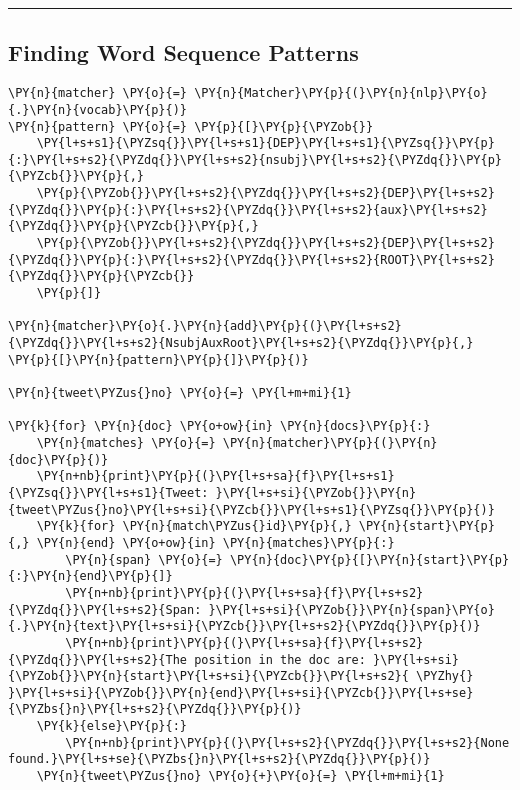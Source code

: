     \begin{center}\rule{0.5\linewidth}{0.5pt}\end{center}

    \hypertarget{finding-word-sequence-patterns}{%
\subsection{Finding Word Sequence
Patterns}\label{finding-word-sequence-patterns}}

    \begin{tcolorbox}[breakable, size=fbox, boxrule=1pt, pad at break*=1mm,colback=cellbackground, colframe=cellborder]
\begin{Verbatim}[commandchars=\\\{\}]
\PY{n}{matcher} \PY{o}{=} \PY{n}{Matcher}\PY{p}{(}\PY{n}{nlp}\PY{o}{.}\PY{n}{vocab}\PY{p}{)}
\PY{n}{pattern} \PY{o}{=} \PY{p}{[}\PY{p}{\PYZob{}}
    \PY{l+s+s1}{\PYZsq{}}\PY{l+s+s1}{DEP}\PY{l+s+s1}{\PYZsq{}}\PY{p}{:}\PY{l+s+s2}{\PYZdq{}}\PY{l+s+s2}{nsubj}\PY{l+s+s2}{\PYZdq{}}\PY{p}{\PYZcb{}}\PY{p}{,} 
    \PY{p}{\PYZob{}}\PY{l+s+s2}{\PYZdq{}}\PY{l+s+s2}{DEP}\PY{l+s+s2}{\PYZdq{}}\PY{p}{:}\PY{l+s+s2}{\PYZdq{}}\PY{l+s+s2}{aux}\PY{l+s+s2}{\PYZdq{}}\PY{p}{\PYZcb{}}\PY{p}{,} 
    \PY{p}{\PYZob{}}\PY{l+s+s2}{\PYZdq{}}\PY{l+s+s2}{DEP}\PY{l+s+s2}{\PYZdq{}}\PY{p}{:}\PY{l+s+s2}{\PYZdq{}}\PY{l+s+s2}{ROOT}\PY{l+s+s2}{\PYZdq{}}\PY{p}{\PYZcb{}}
    \PY{p}{]}

\PY{n}{matcher}\PY{o}{.}\PY{n}{add}\PY{p}{(}\PY{l+s+s2}{\PYZdq{}}\PY{l+s+s2}{NsubjAuxRoot}\PY{l+s+s2}{\PYZdq{}}\PY{p}{,} \PY{p}{[}\PY{n}{pattern}\PY{p}{]}\PY{p}{)}

\PY{n}{tweet\PYZus{}no} \PY{o}{=} \PY{l+m+mi}{1}

\PY{k}{for} \PY{n}{doc} \PY{o+ow}{in} \PY{n}{docs}\PY{p}{:}
    \PY{n}{matches} \PY{o}{=} \PY{n}{matcher}\PY{p}{(}\PY{n}{doc}\PY{p}{)}
    \PY{n+nb}{print}\PY{p}{(}\PY{l+s+sa}{f}\PY{l+s+s1}{\PYZsq{}}\PY{l+s+s1}{Tweet: }\PY{l+s+si}{\PYZob{}}\PY{n}{tweet\PYZus{}no}\PY{l+s+si}{\PYZcb{}}\PY{l+s+s1}{\PYZsq{}}\PY{p}{)}
    \PY{k}{for} \PY{n}{match\PYZus{}id}\PY{p}{,} \PY{n}{start}\PY{p}{,} \PY{n}{end} \PY{o+ow}{in} \PY{n}{matches}\PY{p}{:}
        \PY{n}{span} \PY{o}{=} \PY{n}{doc}\PY{p}{[}\PY{n}{start}\PY{p}{:}\PY{n}{end}\PY{p}{]}
        \PY{n+nb}{print}\PY{p}{(}\PY{l+s+sa}{f}\PY{l+s+s2}{\PYZdq{}}\PY{l+s+s2}{Span: }\PY{l+s+si}{\PYZob{}}\PY{n}{span}\PY{o}{.}\PY{n}{text}\PY{l+s+si}{\PYZcb{}}\PY{l+s+s2}{\PYZdq{}}\PY{p}{)}
        \PY{n+nb}{print}\PY{p}{(}\PY{l+s+sa}{f}\PY{l+s+s2}{\PYZdq{}}\PY{l+s+s2}{The position in the doc are: }\PY{l+s+si}{\PYZob{}}\PY{n}{start}\PY{l+s+si}{\PYZcb{}}\PY{l+s+s2}{ \PYZhy{} }\PY{l+s+si}{\PYZob{}}\PY{n}{end}\PY{l+s+si}{\PYZcb{}}\PY{l+s+se}{\PYZbs{}n}\PY{l+s+s2}{\PYZdq{}}\PY{p}{)}
    \PY{k}{else}\PY{p}{:}
        \PY{n+nb}{print}\PY{p}{(}\PY{l+s+s2}{\PYZdq{}}\PY{l+s+s2}{None found.}\PY{l+s+se}{\PYZbs{}n}\PY{l+s+s2}{\PYZdq{}}\PY{p}{)}
    \PY{n}{tweet\PYZus{}no} \PY{o}{+}\PY{o}{=} \PY{l+m+mi}{1}
\end{Verbatim}
\end{tcolorbox}

